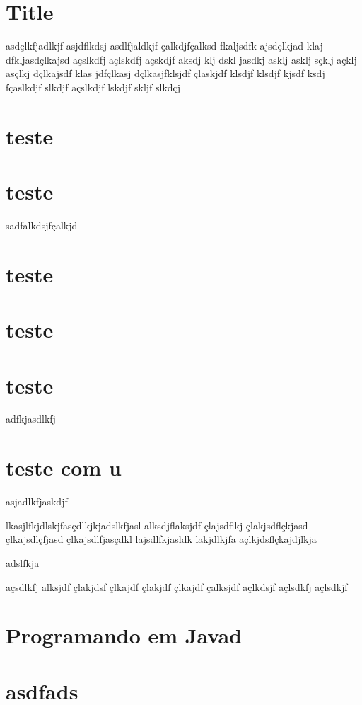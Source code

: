 \documentclass{refcard}
\begin{document}
\flushbottom

\maketitle

\section{Title}

asdçlkfjadlkjf asjdflkdsj asdlfjaldkjf çalkdjfçalksd fkaljsdfk ajsdçlkjad klaj dfkljasdçlkajsd açslkdfj açlskdfj açskdjf aksdj klj dskl jasdkj asklj asklj sçklj açklj asçlkj dçlkajsdf klas jdfçlkasj dçlkasjfklsjdf çlaskjdf klsdjf klsdjf kjsdf ksdj fçaslkdjf slkdjf açslkdjf lskdjf skljf slkdçj

\section{teste}
\lipsum[1-4]

\section{teste}

sadfalkdsjfçalkjd

\section{teste}

\section{teste}


\section{teste}

adfkjasdlkfj


\section{teste com u}


asjadlkfjaskdjf


lkasjlfkjdlskjfasçdlkjkjadslkfjasl 
alksdjflaksjdf
 çlajsdflkj
  çlakjsdflçkjasd
   çlkajsdlçfjasd
    çlkajsdlfjasçdkl 
    lajsdlfkjasldk 
    lakjdlkjfa
    açlkjdsflçkajdjlkja



    adslfkja


     açsdlkfj
     alksjdf
     çlakjdsf
     çlkajdf
     çlakjdf
     çlkajdf
     çalksjdf
     açlkdsjf
     açlsdkfj
     açlsdkjf

\section{Programando em Javad}

\lipsum[1-8]

\section{asdfads}
\end{document}

